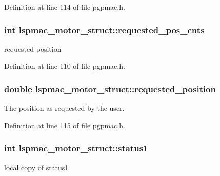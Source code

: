 Definition at line 114 of file pgpmac.\-h.

\hypertarget{structlspmac__motor__struct_a6e8dc9c11dc52a439fe9837230f93ce2}{
\subsubsection[{requested\-\_\-pos\-\_\-cnts}]{\setlength{\rightskip}{0pt plus 5cm}int lspmac\-\_\-motor\-\_\-struct\-::requested\-\_\-pos\-\_\-cnts}}\label{structlspmac__motor__struct_a6e8dc9c11dc52a439fe9837230f93ce2}


requested position 



Definition at line 110 of file pgpmac.\-h.

\hypertarget{structlspmac__motor__struct_af8cdc94c6e2478b12ce942d4cf1d7499}{
\subsubsection[{requested\-\_\-position}]{\setlength{\rightskip}{0pt plus 5cm}double lspmac\-\_\-motor\-\_\-struct\-::requested\-\_\-position}}\label{structlspmac__motor__struct_af8cdc94c6e2478b12ce942d4cf1d7499}


The position as requested by the user. 



Definition at line 115 of file pgpmac.\-h.

\hypertarget{structlspmac__motor__struct_acb52b612b9237e8eec0b97fb1e76a35d}{
\subsubsection[{status1}]{\setlength{\rightskip}{0pt plus 5cm}int lspmac\-\_\-motor\-\_\-struct\-::status1}}\label{structlspmac__motor__struct_acb52b612b9237e8eec0b97fb1e76a35d}


local copy of status1 



